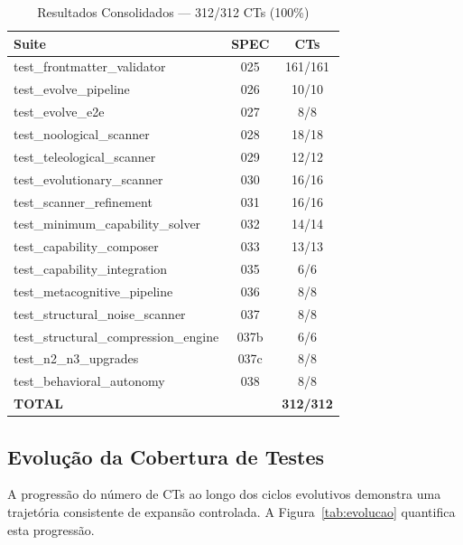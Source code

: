 \begin{table}[H]
\centering
\small
\caption{Resultados Consolidados — 312/312 CTs (100\%)}
\label{tab:tdd_full}
\begin{tabular}{lcc}
\toprule
\textbf{Suite} & \textbf{SPEC} & \textbf{CTs} \\
\midrule
test\_frontmatter\_validator & 025 & 161/161 \\
test\_evolve\_pipeline & 026 & 10/10 \\
test\_evolve\_e2e & 027 & 8/8 \\
test\_noological\_scanner & 028 & 18/18 \\
test\_teleological\_scanner & 029 & 12/12 \\
test\_evolutionary\_scanner & 030 & 16/16 \\
test\_scanner\_refinement & 031 & 16/16 \\
test\_minimum\_capability\_solver & 032 & 14/14 \\
test\_capability\_composer & 033 & 13/13 \\
test\_capability\_integration & 035 & 6/6 \\
test\_metacognitive\_pipeline & 036 & 8/8 \\
test\_structural\_noise\_scanner & 037 & 8/8 \\
test\_structural\_compression\_engine & 037b & 6/6 \\
test\_n2\_n3\_upgrades & 037c & 8/8 \\
test\_behavioral\_autonomy & 038 & 8/8 \\
\midrule
\textbf{TOTAL} & & \textbf{312/312} \\
\bottomrule
\end{tabular}
\end{table}

\subsection{Evolução da Cobertura de Testes}

A progressão do número de CTs ao longo dos ciclos evolutivos demonstra uma trajetória consistente de expansão controlada. A Figura~\ref{tab:evolucao} quantifica esta progressão.

